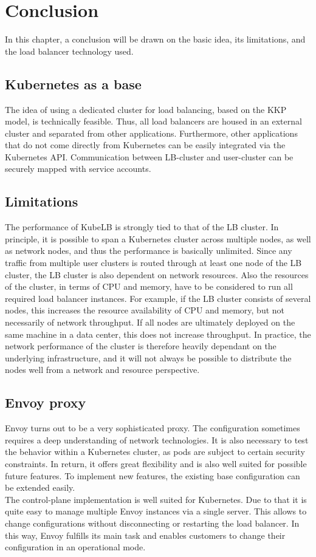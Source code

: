 \chapter{Conclusion}

In this chapter, a conclusion will be drawn on the basic idea, its limitations, and the load balancer technology used.

\section{Kubernetes as a base}
The idea of using a dedicated cluster for load balancing, based on the KKP model, is technically feasible.
Thus, all load balancers are housed in an external cluster and separated from other applications.
Furthermore, other applications that do not come directly from Kubernetes can be easily integrated via the Kubernetes API.
Communication between LB-cluster and user-cluster can be securely mapped with service accounts.

\section{Limitations}
The performance of KubeLB is strongly tied to that of the LB cluster.
In principle, it is possible to span a Kubernetes cluster across multiple nodes, as well as network nodes, and thus the performance is basically unlimited.
Since any traffic from multiple user clusters is routed through at least one node of the LB cluster, the LB cluster is also dependent on network resources.
Also the resources of the cluster, in terms of CPU and memory, have to be considered to run all required load balancer instances.
For example, if the LB cluster consists of several nodes, this increases the resource availability of CPU and memory, but not necessarily of network throughput.
If all nodes are ultimately deployed on the same machine in a data center, this does not increase throughput.
In practice, the network performance of the cluster is therefore heavily dependant on the underlying infrastructure, and it will not always be possible to distribute the nodes well from a network and resource perspective.

\section{Envoy proxy}
Envoy turns out to be a very sophisticated proxy.
The configuration sometimes requires a deep understanding of network technologies.
It is also necessary to test the behavior within a Kubernetes cluster, as pods are subject to certain security constraints.
In return, it offers great flexibility and is also well suited for possible future features.
To implement new features, the existing base configuration can be extended easily.
\\
The control-plane implementation is well suited for Kubernetes.
Due to that it is quite easy to manage multiple Envoy instances via a single server.
This allows to change configurations without disconnecting or restarting the load balancer.
In this way, Envoy fulfills its main task and enables customers to change their configuration in an operational mode.
